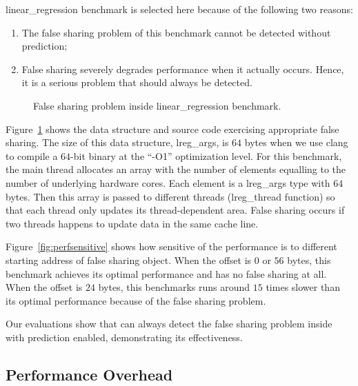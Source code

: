 linear\_regression benchmark is selected here because of the following two reasons:
\begin{enumerate}
\item
The false sharing problem of this benchmark cannot be detected without prediction; 
\item
False sharing severely degrades performance when it actually occurs. Hence, it is a serious problem that should always be detected. 
\end{enumerate}

\begin{figure}[!ht]
{\centering
\subfigure{}
\caption{False sharing problem inside linear\_regression benchmark.
\label{fig:linearregression}}
}
\end{figure}

Figure~\ref{fig:linearregression} shows the data structure and source code exercising appropriate false sharing. The size of this data structure, lreg\_args, is $64$ bytes 
when we use clang to compile a $64$-bit binary at the ``-O1'' optimization level. For this benchmark, the main thread allocates an array with the number of elements equalling to the number of underlying hardware cores. Each element is a lreg\_args type with $64$ bytes. Then this array is passed to different threads (lreg\_thread function) so that each thread only updates its thread-dependent area. False sharing occurs if two threads happens to update data in the same cache line. 

Figure~\ref{fig:perfsensitive} shows how sensitive  of the performance is to different starting address of false sharing object. When the offset is $0$ or $56$ bytes, this benchmark achieves its optimal performance and has no false sharing at all. When the offset is $24$ bytes, this benchmarks runs around $15$ times slower than its optimal performance because of the false sharing problem.

Our evaluations show that \Predator{} can always detect the false sharing problem inside with prediction enabled, demonstrating its effectiveness.

\subsection{Performance Overhead}
\label{sec:perfoverhead}

